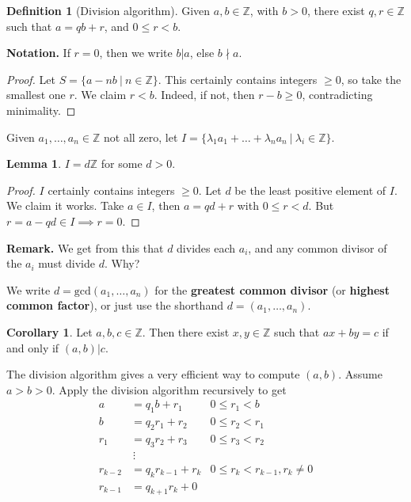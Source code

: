 \documentclass{article}
\theoremstyle{definition}
\newtheorem{lemma}[theorem]{Lemma}
\newtheorem{cor}[theorem]{Corollary}
\newtheorem{defn}{Definition}[section]
\begin{document}
\begin{defn}[Division algorithm]
    Given $a,b \in \mathbb{Z}$, with $b>0$, there exist $q,r \in \mathbb{Z}$ such that $a = qb + r$, and $0 \le r < b$.
\end{defn}

\textbf{Notation.} If $r=0$, then we write $b | a$, else $b\nmid a$. 

\begin{proof}
    Let $S = \{a - nb ~|~ n \in \mathbb{Z}\}$. This certainly contains integers $\ge 0$, so take the smallest one $r$. We claim $r < b$. Indeed, if not, then $r - b \ge 0$, contradicting minimality.
\end{proof}

Given $a_1, \ldots, a_n \in \mathbb{Z}$ not all zero, let $I = \{\lambda_1 a_1 + \ldots + \lambda_n a_n ~|~ \lambda_i \in \mathbb{Z}\}$.

\begin{lemma}
    $I = d \mathbb{Z}$ for some $d > 0$.
\end{lemma}
\begin{proof}
    $I$ certainly contains integers $\ge 0$. Let $d$ be the least positive element of $I$. We claim it works. Take $a \in I$, then $a = qd + r$ with $0 \le r < d$. But $r = a - qd \in I \implies r = 0$.
\end{proof}

\textbf{Remark.} We get from this that $d$ divides each $a_i$, and any common divisor of the $a_i$ must divide $d$. Why?

We write $d = \text{gcd}(a_1, \ldots, a_n)$ for the \textbf{greatest common divisor} (or \textbf{highest common factor}), or just use the shorthand $d = (a_1, \ldots, a_n)$.

\begin{cor}
    Let $a,b,c \in \mathbb{Z}$. Then there exist $x,y \in \mathbb{Z}$ such that $ax+by=c$ if and only if $(a,b) | c$.
\end{cor}

The division algorithm gives a very efficient way to compute $(a,b)$. Assume $a>b>0$. Apply the division algorithm recursively to get
\begin{align*}
    a &= q_1 b + r_1 & 0 \leq r_1 < b\\
    b &= q_2 r_1 + r_2 & 0 \leq r_2 < r_1\\
    r_1 &= q_3 r_2 + r_3 & 0 \leq r_3 < r_2\\
    &~ \vdots \\
    r_{k-2} &= q_k r_{k-1} + r_k & 0 \leq r_k < r_{k-1}, r_k \neq0\\
    r_{k-1} &= q_{k+1} r_k + 0
\end{align*}
\end{document}

